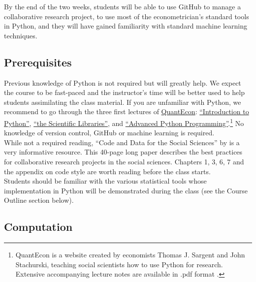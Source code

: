 \documentclass{article}
\numberwithin{equation}{section}
\begin{document}
By the end of the two weeks, students will be able to use GitHub to manage a collaborative research project, to use most of the econometrician's standard tools in Python, and they will have gained familiarity with standard machine learning techniques.

\vspace{0.5cm}

\subsection*{Prerequisites}

\vspace{0.5cm}

Previous knowledge of Python is not required but will greatly help. We expect the course to be fast-paced and the instructor's time will be better used to help students assimilating the class material. If you are unfamiliar with Python, we recommend to go through the three first lectures of \href{https://lectures.quantecon.org/py/}{QuantEcon}: \href{https://lectures.quantecon.org/py/index_learning_python.html}{``Introduction to Python''}, \href{https://lectures.quantecon.org/py/index_python_scientific_libraries.html}{``the Scientific Libraries''}, and \href{https://lectures.quantecon.org/py/index_advanced_python_programming.html}{``Advanced Python Programming''}.\footnote{QuantEcon is a website created by economists Thomas J. Sargent and John Stachurski, teaching social scientists how to use Python for research. Extensive accompanying lecture notes are available in .pdf format \citep{sargent2019lectures}.} No knowledge of version control, GitHub or machine learning is required.\\

While not a required reading, ``Code and Data for the Social Sciences'' by \cite{gentzkow2014code} is a very informative resource. This 40-page long paper describes the best practices for collaborative research projects in the social sciences. Chapters 1, 3, 6, 7 and the appendix on code style are worth reading before the class starts.\\

Students should be familiar with the various statistical tools whose implementation in Python will be demonstrated during the class (see the Course Outline section below).

\vspace{0.5cm}

\subsection*{Computation}
\end{document}
